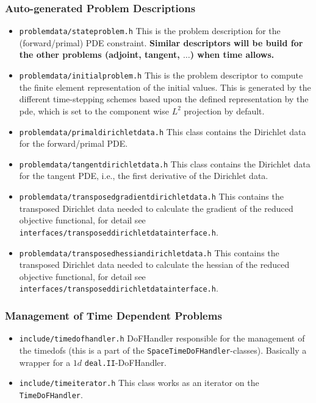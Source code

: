 \subsubsection{Auto-generated Problem Descriptions}
\begin{itemize}
  \item \texttt{problemdata/stateproblem.h} This is the problem description for the (forward/primal) PDE constraint.
    {\bf Similar descriptors will be build for the other problems (adjoint, tangent, $\ldots$) when time allows.}
  \item \texttt{problemdata/initialproblem.h} This is the problem descriptor to compute the finite element representation
    of the initial values. This is generated by the different time-stepping schemes based upon the defined 
    representation by the pde, which is set to the component wise $L^2$ projection by default.
  \item \texttt{problemdata/primaldirichletdata.h} This class contains the Dirichlet data for the 
    forward/primal PDE.
  \item \texttt{problemdata/tangentdirichletdata.h} This class contains the Dirichlet data for the tangent PDE, i.e.,
    the first derivative of the Dirichlet data.
  \item \texttt{problemdata/transposedgradientdirichletdata.h} This contains the transposed Dirichlet data needed 
    to calculate the gradient of the reduced objective functional, 
    for detail see \texttt{interfaces/transposeddirichletdatainterface.h}.
  \item \texttt{problemdata/transposedhessiandirichletdata.h} This contains the transposed Dirichlet data needed 
    to calculate the hessian of the reduced objective functional, 
    for detail see \texttt{interfaces/transposeddirichletdatainterface.h}.
\end{itemize}
\subsubsection{Management of Time Dependent Problems}
\begin{itemize}
\item \texttt{include/timedofhandler.h} DoFHandler responsible for the management of the timedofs (this is a part of the \texttt{SpaceTimeDoFHandler}-classes). Basically a wrapper for a $1d$ \texttt{deal.II}-DoFHandler.
\item \texttt{include/timeiterator.h} This class works as an iterator on the \texttt{TimeDoFHandler}.                 
\end{itemize}
